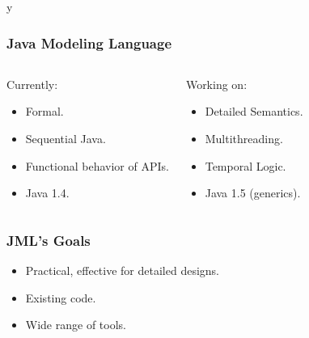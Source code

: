 \if y\MAKEHANDOUTS \documentclass[t,compress,landscape,handout]{beamer}
\begin{document}
\begin{frame}
\frametitle{Java Modeling Language}
\begin{columns}[t]
\begin{block}{Currently:}
\begin{itemize}
\item
Formal.

\item 
Sequential Java.

\item
Functional behavior of APIs.

\item
Java 1.4.
\end{itemize}
\end{block}

\pause

\begin{block}{Working on:}
\begin{itemize}
\item
Detailed Semantics.

\item 
Multithreading.

\item
Temporal Logic.

\item
Java 1.5 (generics).
\end{itemize}
\end{block}
\end{columns}
\end{frame}

\begin{frame}
\frametitle{JML's Goals}
\begin{itemize}
\item
Practical, effective for detailed designs.

\item
Existing code.

\item
Wide range of tools.
\end{itemize}
\end{frame}
\end{document}
